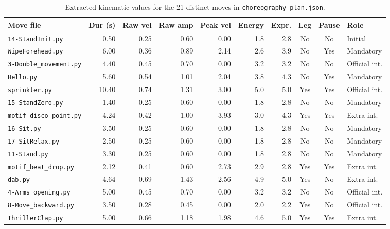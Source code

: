 \documentclass[11pt,a4paper]{article}
\newcommand{\code}[1]{\texttt{#1}}
\begin{document}
\begin{table}[H]
  \centering
  \scriptsize
  \setlength{\tabcolsep}{4.2pt}
  \caption{Extracted kinematic values for the 21 distinct moves in \code{choreography\_plan.json}.}
  \label{tab:kin}
  \begin{tabular}{l r r r r r r c c l}
    \toprule
    \textbf{Move file} & \textbf{Dur (s)} & \textbf{Raw vel} & \textbf{Raw amp} & \textbf{Peak vel} & \textbf{Energy} & \textbf{Expr.} & \textbf{Leg} & \textbf{Pause} & \textbf{Role} \\
    \midrule
    \code{14-StandInit.py}         &  0.50 & 0.25 & 0.60 & 0.00 & 1.8 & 2.8 & No  & No  & Initial \\
    \code{WipeForehead.py}         &  6.00 & 0.36 & 0.89 & 2.14 & 2.6 & 3.9 & No  & Yes & Mandatory \\
    \code{3-Double\_movement.py}   &  4.40 & 0.45 & 0.70 & 0.00 & 3.2 & 3.2 & No  & No  & Official int. \\
    \code{Hello.py}                &  5.60 & 0.54 & 1.01 & 2.04 & 3.8 & 4.3 & No  & Yes & Mandatory \\
    \code{sprinkler.py}            & 10.40 & 0.74 & 1.31 & 3.00 & 5.0 & 5.0 & Yes & Yes & Official int. \\
    \code{15-StandZero.py}         &  1.40 & 0.25 & 0.60 & 0.00 & 1.8 & 2.8 & No  & No  & Mandatory \\
    \code{motif\_disco\_point.py}  &  4.24 & 0.42 & 1.00 & 3.93 & 3.0 & 4.3 & Yes & Yes & Extra int. \\
    \code{16-Sit.py}               &  3.50 & 0.25 & 0.60 & 0.00 & 1.8 & 2.8 & No  & No  & Mandatory \\
    \code{17-SitRelax.py}          &  2.50 & 0.25 & 0.60 & 0.00 & 1.8 & 2.8 & No  & No  & Mandatory \\
    \code{11-Stand.py}             &  3.30 & 0.25 & 0.60 & 0.00 & 1.8 & 2.8 & No  & No  & Mandatory \\
    \code{motif\_beat\_drop.py}    &  2.12 & 0.41 & 0.60 & 2.73 & 2.9 & 2.8 & Yes & Yes & Extra int. \\
    \code{dab.py}                  &  4.64 & 0.69 & 1.43 & 2.56 & 4.9 & 5.0 & Yes & No  & Extra int. \\
    \code{4-Arms\_opening.py}      &  5.00 & 0.45 & 0.70 & 0.00 & 3.2 & 3.2 & No  & No  & Official int. \\
    \code{8-Move\_backward.py}     &  3.50 & 0.28 & 0.45 & 0.00 & 2.0 & 2.2 & Yes & No  & Official int. \\
    \code{ThrillerClap.py}         &  5.00 & 0.66 & 1.18 & 1.98 & 4.6 & 5.0 & Yes & Yes & Extra int. \\

\end{tabular}
\end{table}
\end{document}
